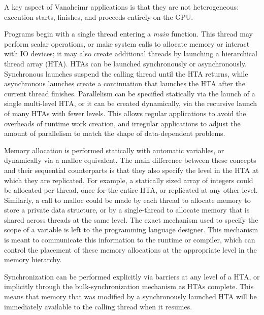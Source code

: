 \documentclass[conference, 10pt]{IEEEtran}
\begin{document}
A key aspect of Vanaheimr applications is that they are not heterogeneous:
execution starts, finishes, and proceeds entirely on the GPU.  

Programs begin with a single thread entering a \textit{main} function.  This
thread may perform scalar operations, or make system calls to allocate memory or
interact with IO devices; it may also create additional threads by launching a
hierarchical thread array (HTA).  HTAs can be launched synchronously or
asynchronously.  Synchronous launches suspend the calling thread until the
HTA returns, while asynchronous
launches create a continuation that launches the HTA after the current thread
finishes.  Parallelism can be specified statically via the launch of a single
multi-level HTA, or it can be created dynamically, via the recursive launch of
many HTAs with fewer levels.  This allows regular applications to avoid the
overheads of runtime work creation, and irregular applications to adjust the
amount of parallelism to match the shape of data-dependent problems.

Memory allocation is performed statically with automatic variables, or
dynamically via a malloc equivalent.  The main difference between these concepts
and their sequential counterparts is that they also specify the level in the HTA
at which they are replicated.  For example, a statically sized array of integers
could be allocated per-thread, once for the entire HTA, or replicated at any
other level.  Similarly, a call to malloc could be made by each thread to
allocate memory to store a private data structure, or by a single-thread to
allocate memory that is shared across threads at the same level.  
The exact mechanism used to specify the scope of a variable is left to the 
programming language designer.  This mechanism is meant to communicate this 
information to the runtime or compiler, which can control the placement of these
memory allocations at the appropriate level in the memory hierarchy.

Synchronization can be performed explicitly via barriers at any level of a HTA,
or implicitly through the bulk-synchronization mechanism as HTAs complete.  This
means that memory that was modified by a synchronously launched HTA will be 
immediately available to the calling thread when it resumes.  


\end{document}

